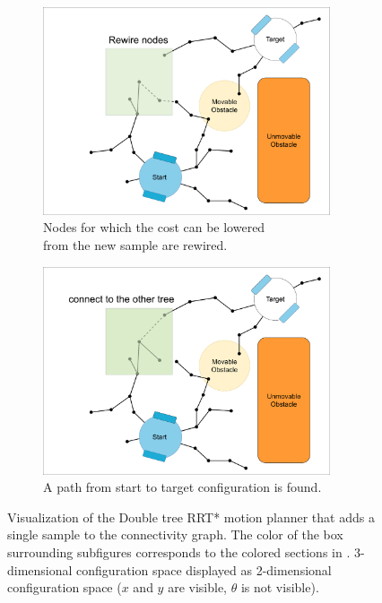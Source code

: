 \begin{figure}[H]
    \begin{subfigure}{.49\textwidth}
    \centering
    \includegraphics[width=0.93\textwidth, cfbox=my_green 5pt 0pt]{figures/required_background/mp/5mp_rewire.drawio.png}
    \caption{Nodes for which the cost can be lowered\\from the new sample are rewired.}%
    \label{subfig:mp_rewire}
    \end{subfigure}
    \begin{subfigure}{.49\textwidth}
    \centering
    \includegraphics[width=0.93\textwidth, cfbox=my_green 5pt 0pt]{figures/required_background/mp/6mp_search_other_tree.drawio.png}
    \caption{A path from start to target configuration is found. \bs}
    \end{subfigure}

    \caption{Visualization of the Double tree \acs{RRT*} motion planner that adds a single sample to the connectivity graph. The color of the box surrounding subfigures corresponds to the colored sections in . 3-dimensional configuration space displayed as 2-dimensional configuration space ($x$ and $y$ are visible, $\theta$ is not visible).}
    \label{fig:motion_planner_adding_one_sample}
\end{figure}

